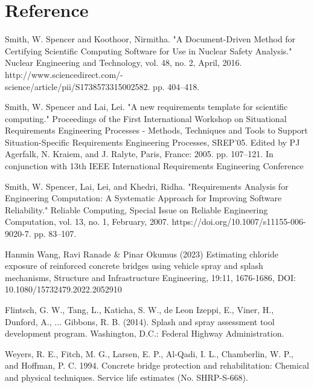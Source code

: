 \documentclass[12pt]{article}
\newcounter{refnum} %
\begin{document}
\newpage
\section*{Reference}
\begin{enumerate}[label={[\arabic*]}]
\item {} \label{ref1}
Smith, W. Spencer and Koothoor, Nirmitha. "A Document-Driven Method for Certifying Scientific Computing Software for Use in Nuclear Safety Analysis." Nuclear Engineering and Technology, vol. 48, no. 2, April, 2016. http://www.sciencedirect.com/-\\science/article/pii/S1738573315002582. pp. 404--418.

\item {} \label{ref2}
Smith, W. Spencer and Lai, Lei. "A new requirements template for scientific computing." Proceedings of the First International Workshop on Situational Requirements Engineering Processes - Methods, Techniques and Tools to Support Situation-Specific Requirements Engineering Processes, SREP'05. Edited by PJ Agerfalk, N. Kraiem, and J. Ralyte, Paris, France: 2005. pp. 107–121. In conjunction with 13th IEEE International Requirements Engineering Conference

\item {} \label{ref3}
Smith, W. Spencer, Lai, Lei, and Khedri, Ridha. "Requirements Analysis for Engineering Computation: A Systematic Approach for Improving Software Reliability." Reliable Computing, Special Issue on Reliable Engineering Computation, vol. 13, no. 1, February, 2007. https://doi.org/10.1007/s11155-006-9020-7. pp. 83--107.

\item {} \label{ref4}
Hanmin Wang, Ravi Ranade \& Pinar Okumus (2023) Estimating chloride exposure of reinforced concrete bridges using vehicle spray and splash mechanisms, Structure and Infrastructure Engineering, 19:11, 1676-1686, DOI: 10.1080/15732479.2022.2052910

\item {} \label{ref5}
Flintsch, G. W., Tang, L., Katicha, S. W., de Leon Izeppi, E., Viner, H., Dunford, A., ... Gibbons, R. B. (2014). Splash and spray assessment tool development program. Washington, D.C.: Federal Highway Administration.

\item {} \label{ref6}
Weyers, R. E., Fitch, M. G., Larsen, E. P., Al-Qadi, I. L., Chamberlin, W. P., and Hoffman, P.  C. 1994. Concrete bridge protection and rehabilitation: Chemical and physical techniques. Service life estimates (No. SHRP-S-668).


\end{enumerate}
\end{document}
